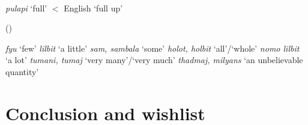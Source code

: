 \documentclass{article}
\begin{document}
\begin{exe} 
   \\
  {\it pulapi} `full' $<$ English `full up'

   (\citealt[100]{sandefur79})
  \begin{xlist}
    \ex \textit{fyu} `few'
    \ex \textit{lilbit} `a little'
    \ex \textit{sam, sambala} `some'
    \ex \textit{holot, holbit} `all'/`whole'
    \ex \textit{nomo lilbit} `a lot'
    \ex \textit{tumani, tumaj} `very many'/`very much'
    \ex \textit{thadmaj, milyans} `an unbelievable quantity'
  \end{xlist}
\end{exe}

\section{Conclusion and wishlist}
\end{document}
